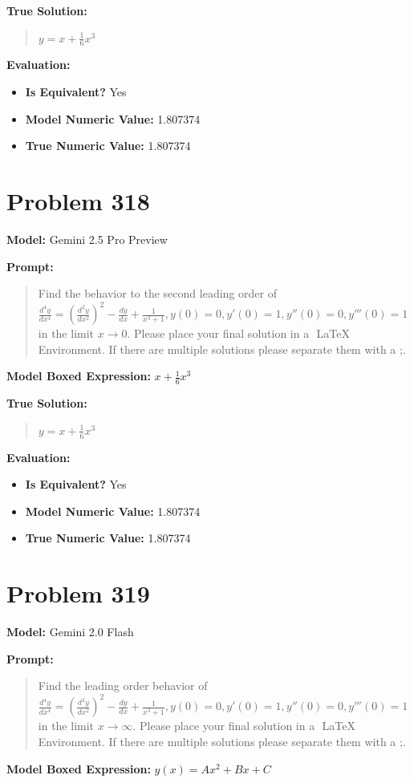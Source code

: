 \documentclass{article}
\begin{document}
{\textbf{True Solution:}
\begin{quote}
$y = x + \frac{1}{6}x^3$
\end{quote}

\textbf{Evaluation:}
\begin{itemize}
\item \textbf{Is Equivalent?} Yes
\item \textbf{Model Numeric Value:} 1.807374
\item \textbf{True Numeric Value:} 1.807374
\end{itemize}
\vspace{1cm}
\section*{Problem 318}
\textbf{Model:} Gemini 2.5 Pro Preview

\textbf{Prompt:}
\begin{quote}
Find the behavior to the second leading order of $\frac{d^4 y}{dx^4} = (\frac{d^2 y}{dx^2})^2 - \frac{d y}{dx}+ \frac{1}{x^3+1}, y(0)=0, y'(0)=1, y''(0)=0, y'''(0)=1$ in the limit $x \rightarrow 0$. Please place your final solution in a $\boxed{}$ LaTeX Environment. If there are multiple solutions please separate them with a ;.
\end{quote}
\textbf{Model Boxed Expression:} $x + \frac{1}{6}x^3$

\textbf{True Solution:}
\begin{quote}
$y = x + \frac{1}{6}x^3$
\end{quote}

\textbf{Evaluation:}
\begin{itemize}
\item \textbf{Is Equivalent?} Yes
\item \textbf{Model Numeric Value:} 1.807374
\item \textbf{True Numeric Value:} 1.807374
\end{itemize}
\vspace{1cm}
\section*{Problem 319}
\textbf{Model:} Gemini 2.0 Flash

\textbf{Prompt:}
\begin{quote}
Find the leading order behavior of $\frac{d^4 y}{dx^4} = (\frac{d^2 y}{dx^2})^2 - \frac{d y}{dx}+ \frac{1}{x^3+1}, y(0)=0, y'(0)=1, y''(0)=0, y'''(0)=1$ in the limit $ x \rightarrow \infty$. Please place your final solution in a $\boxed{}$ LaTeX Environment. If there are multiple solutions please separate them with a ;.
\end{quote}
\textbf{Model Boxed Expression:} $y(x) = Ax^2 + Bx + C$

}
\end{document}
